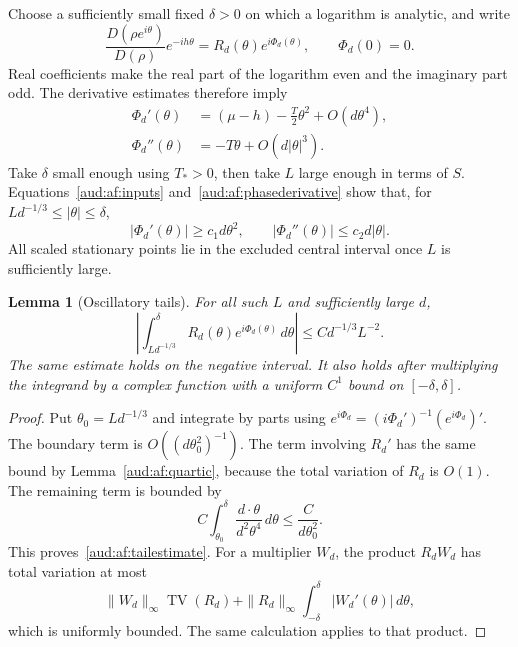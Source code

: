 \documentclass[11pt,a4paper]{article}
\numberwithin{equation}{section}
\newtheorem{lemma}[theorem]{Lemma}
\begin{document}
Choose a sufficiently small fixed $\delta>0$ on which a logarithm is analytic, and write
\[
 \frac{D(\rho e^{i\theta})}{D(\rho)}e^{-ih\theta}
 =R_d(\theta)e^{i\Phi_d(\theta)},\qquad \Phi_d(0)=0.
\]
Real coefficients make the real part of the logarithm even and the imaginary part odd. The derivative estimates therefore imply
\begin{align}
 \Phi_d'(\theta)&=(\mu-h)-\frac T2\theta^2+O(d\theta^4),
 \label{aud:af:phasederivative}\\
 \Phi_d''(\theta)&=-T\theta+O(d|\theta|^3).
 \nonumber
\end{align}
Take $\delta$ small enough using $T_*>0$, then take $L$ large enough in terms of $S$. Equations~\eqref{aud:af:inputs} and~\eqref{aud:af:phasederivative} show that, for $Ld^{-1/3}\le|\theta|\le\delta$,
\begin{equation}\label{aud:af:tailderivatives}
 |\Phi_d'(\theta)|\ge c_1d\theta^2,\qquad
 |\Phi_d''(\theta)|\le c_2d|\theta|.
\end{equation}
All scaled stationary points lie in the excluded central interval once $L$ is sufficiently large.

\begin{lemma}[Oscillatory tails]\label{aud:af:tails}
For all such $L$ and sufficiently large $d$,
\begin{equation}\label{aud:af:tailestimate}
 \left|\int_{Ld^{-1/3}}^\delta
 R_d(\theta)e^{i\Phi_d(\theta)}\,d\theta\right|
 \le C d^{-1/3}L^{-2}.
\end{equation}
The same estimate holds on the negative interval. It also holds after multiplying the integrand by a complex function with a uniform $C^1$ bound on $[-\delta,\delta]$.
\end{lemma}
\begin{proof}
Put $\theta_0=Ld^{-1/3}$ and integrate by parts using
$e^{i\Phi_d}=(i\Phi_d')^{-1}(e^{i\Phi_d})'$. The boundary term is $O((d\theta_0^2)^{-1})$. The term involving $R_d'$ has the same bound by Lemma~\ref{aud:af:quartic}, because the total variation of $R_d$ is $O(1)$. The remaining term is bounded by
\[
 C\int_{\theta_0}^\delta
 \frac{d\cdot\theta}{d^2\theta^4}\,d\theta
 \le\frac{C}{d\theta_0^2}.
\]
This proves~\eqref{aud:af:tailestimate}. For a multiplier $W_d$, the product $R_dW_d$ has total variation at most
\[
 \|W_d\|_\infty\operatorname{TV}(R_d)
 +\|R_d\|_\infty\int_{-\delta}^\delta|W_d'(\theta)|\,d\theta,
\]
which is uniformly bounded. The same calculation applies to that product.
\end{proof}
\end{document}
